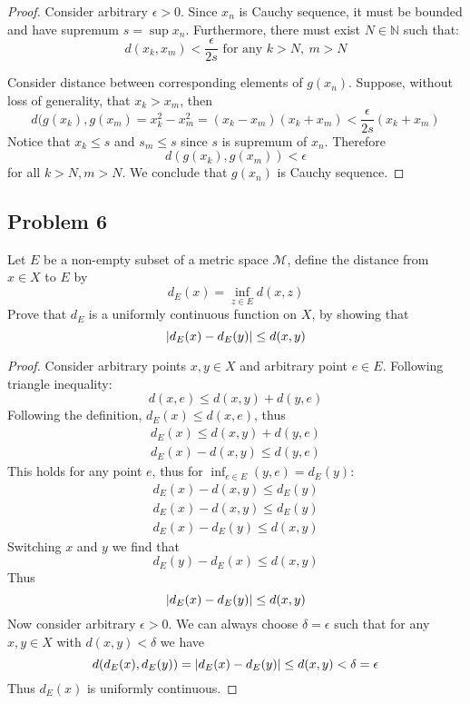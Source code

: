 \documentclass{article}
\newcommand{\N}{\mathbb{N}}
\DeclarePairedDelimiter{\abs}{\lvert}{\rvert}
\begin{document}
\begin{proof}

Consider arbitrary $\epsilon > 0$. Since $x_n$ is Cauchy sequence, it must be bounded and have supremum $s = \sup x_n$.
Furthermore, there must exist $N \in \N$ such that:
\[ d(x_k, x_m) < \frac{\epsilon}{2s} \text{ for any } k > N, \> m > N \]

Consider distance between corresponding elements of $g(x_n)$.
Suppose, without loss of generality, that $x_k > x_m$, then
\[ d (g(x_k), g(x_m) = x_k^2 - x_m^2 = (x_k - x_m) (x_k + x_m) <  \frac{\epsilon}{2s} (x_k+x_m) \]
Notice that $x_k \leq s$ and $s_m \leq s$ since $s$ is supremum of $x_n$. Therefore
\[ d (g(x_k), g(x_m)) < \epsilon \]
for all $k > N, m > N$.
We conclude that $g(x_n)$ is Cauchy sequence.

\end{proof}


\subsection*{Problem 6}

\begin{tcolorbox}
Let $E$ be a non-empty subset of a metric space $\mathcal{M}$, define the distance from $x \in X$ to $E$ by
\[ d_E(x) = \inf_{z \in E} d(x,z) \]
Prove that $d_E$ is a uniformly continuous function on $X$, by showing that
\[ \abs{ d_E(x) - d_E(y) } \leq d(x,y) \]
\end{tcolorbox}

\begin{proof}

Consider arbitrary points $x,y \in X$ and arbitrary point $e \in E$. Following triangle inequality:
\[ d(x,e) \leq d(x,y) + d(y,e) \]
Following the definition, $d_E(x) \leq d(x,e)$, thus 
\begin{gather*}
    d_E(x) \leq d(x,y) + d(y,e) \\
    d_E(x) - d(x,y) \leq d(y,e)    
\end{gather*}
This holds for any point $e$, thus for $\inf_{e \in E}(y,e) = d_E(y)$:
\begin{gather*}
    d_E(x) - d(x,y) \leq d_E(y) \\
    d_E(x) - d(x,y) \leq d_E(y) \\
    d_E(x) - d_E(y) \leq d(x,y)    
\end{gather*}
Switching $x$ and $y$ we find that
\[ d_E(y) - d_E(x) \leq d(x,y) \]
Thus
\[ \abs{ d_E(x) - d_E(y) } \leq d(x,y) \]
Now consider arbitrary $\epsilon > 0$.
We can always choose $\delta = \epsilon$ such that for any $x,y \in X$ with $d(x,y)<\delta$ we have
\[ d(d_E(x), d_E(y)) = \abs{d_E(x)-d_E(y)} \leq d(x,y) < \delta = \epsilon \]
Thus $d_E(x)$ is uniformly continuous.

\end{proof}
\end{document}
